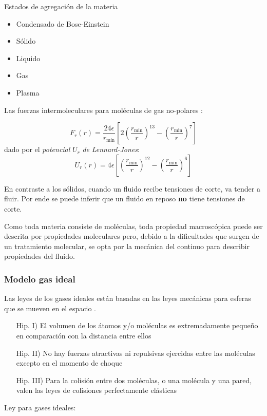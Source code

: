 Estados de agregación de la materia
\begin{itemize}
    \item Condensado de Bose-Einstein
    \item Sólido
    \item Liquido
    \item Gas
    \item Plasma 
\end{itemize}



Las fuerzas intermoleculares para moléculas de gas no-polares \citep{bird2002transport}: 

\[
F_r(r)=\frac{24 \epsilon}{r_{\min}}\left[ 2\left( \frac{r_{\min}}{r}\right)^{13} - \left( \frac{r_{\min}}{r} \right)^7 \right]
\]
dado por el \textit{potencial} $U_r$ \textit{de} \textit{Lennard-Jones}:
\[
U_r(r) = 4\epsilon \left[ \left(\frac{r_{\min}}{r}\right)^{12} - \left( \frac{r_{\min}}{r}\right)^6 \right] 
\]

En contraste a los sólidos, cuando un fluido recibe tensiones de corte, va tender a fluir. Por ende se puede inferir que un fluido en reposo \textbf{no} tiene tensiones de corte. 

Como toda materia consiste de moléculas, toda propiedad macroscópica puede ser descrita por propiedades moleculares pero, debido a la dificultades que surgen de un tratamiento molecular, se opta por la mecánica del continuo para describir propiedades del fluido\citep{durst2008fluid}. 
\subsubsection*{Modelo gas ideal}

Las leyes de los gases ideales están basadas en las leyes mecánicas para esferas que se mueven en el espacio \citep{durst2008fluid}.
\begin{itemize} 
    \item[Hip. I)] El volumen de los átomos y/o moléculas es extremadamente pequeño en comparación con la distancia entre ellos
    \item[Hip. II)] No hay fuerzas atractivas ni repulsivas ejercidas entre las moléculas excepto en el momento de choque
    \item[Hip. III)] Para la colisión entre dos moléculas, o una molécula y una pared, valen las leyes de colisiones perfectamente elásticas 
\end{itemize}

Ley para gases ideales:

